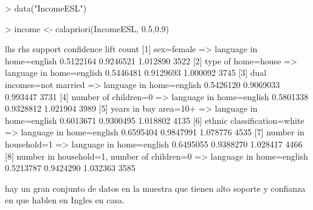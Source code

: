 \documentclass [a4paper] {article}
\begin{document}
\begin{Schunk}
\begin{Sinput}
> data("IncomeESL")
\end{Sinput}
\end{Schunk}
\begin{Schunk}
\begin{Sinput}
> income <- calapriori(IncomeESL, 0.5,0.9)
\end{Sinput}
\begin{Soutput}
    lhs                              rhs                          support confidence     lift count
[1] {sex=female}                  => {language in home=english} 0.5122164  0.9246521 1.012890  3522
[2] {type of home=house}          => {language in home=english} 0.5446481  0.9129693 1.000092  3745
[3] {dual incomes=not married}    => {language in home=english} 0.5426120  0.9069033 0.993447  3731
[4] {number of children=0}        => {language in home=english} 0.5801338  0.9328812 1.021904  3989
[5] {years in bay area=10+}       => {language in home=english} 0.6013671  0.9300495 1.018802  4135
[6] {ethnic classification=white} => {language in home=english} 0.6595404  0.9847991 1.078776  4535
[7] {number in household=1}       => {language in home=english} 0.6495055  0.9388270 1.028417  4466
[8] {number in household=1,                                                                        
     number of children=0}        => {language in home=english} 0.5213787  0.9424290 1.032363  3585
\end{Soutput}
\end{Schunk}
hay un gran conjunto de datos en la muestra que tienen alto soporte y confianza en que hablen en Ingles en casa.
\end{document}
